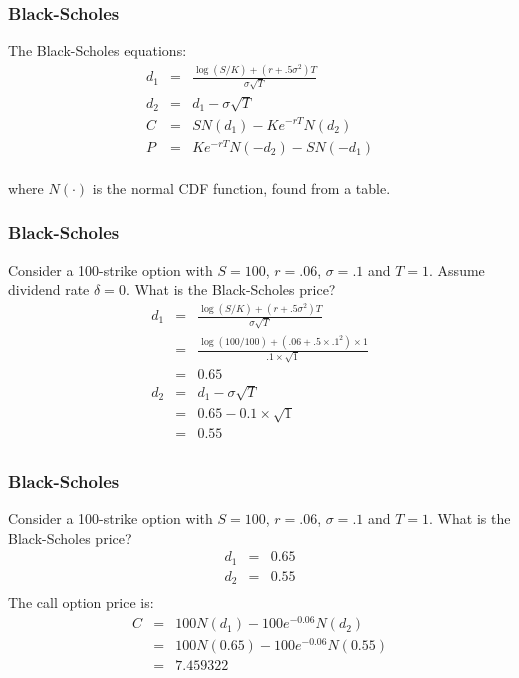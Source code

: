\documentclass{beamer}
\begin{document}
\begin{frame}
\frametitle{Black-Scholes}
The Black-Scholes equations:
\begin{eqnarray*}
d_1 &=& \frac{\log(S/K) + (r+.5 \sigma^2) T}{\sigma \sqrt{T}} \\
d_2 &=& d_1-\sigma\sqrt{T} \\
C &=& S N(d_1) - K e^{-rT} N(d_2) \\
P &=& K e^{-rT} N(-d_2) - S N(-d_1) \\
\end{eqnarray*}

where $N(\cdot)$ is the normal CDF function, found from a table.
\end{frame}

\begin{frame}
\frametitle{Black-Scholes}
Consider a 100-strike option with \(S=100\), \(r = .06\), \(\sigma = .1\) and \(T=1\). Assume dividend rate \(\delta = 0\). What is the Black-Scholes price?
\pause
\begin{eqnarray*}
d_1 &=& \frac{\log(S/K) + (r + .5 \sigma^2) T}{\sigma \sqrt{T}} \\
    &=& \frac{\log(100/100) + (.06 + .5 \times .1^2) \times 1}{.1 \times \sqrt{1}} \\
    &=& 0.65 \\
d_2 &=& d_1 - \sigma\sqrt{T} \\
    &=& 0.65 - 0.1 \times \sqrt{1} \\
    &=& 0.55 \\
\end{eqnarray*}

\end{frame}

\begin{frame}
\frametitle{Black-Scholes}
Consider a 100-strike option with \(S=100\), \(r = .06\), \(\sigma = .1\) and \(T=1\). What is the Black-Scholes price?
\begin{eqnarray*}
d_1 &=&  0.65 \\
d_2 &=&  0.55 \\
\end{eqnarray*}
The call option price is:
\begin{eqnarray*}
C &=& 100 N(d_1) - 100 e^{-0.06} N(d_2) \\
  &=& 100 N(0.65) - 100 e^{-0.06} N(0.55) \\
  &=& 7.459322
\end{eqnarray*}
\end{frame}
\end{document}
